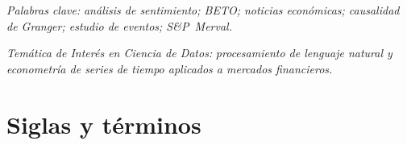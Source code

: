 \documentclass[11pt,a4paper,oneside]{report}
\begin{document}
\vspace{6pt}
\textit{Palabras clave:} \textit{análisis de sentimiento; BETO; noticias económicas;
causalidad de Granger; estudio de eventos; S\&P~Merval.}

\textit{Temática de Interés en Ciencia de Datos:} \textit{procesamiento de lenguaje natural
y econometría de series de tiempo aplicados a mercados financieros.}

\tableofcontents
\listoffigures
\listoftables

\chapter*{Siglas y términos}
\end{document}
